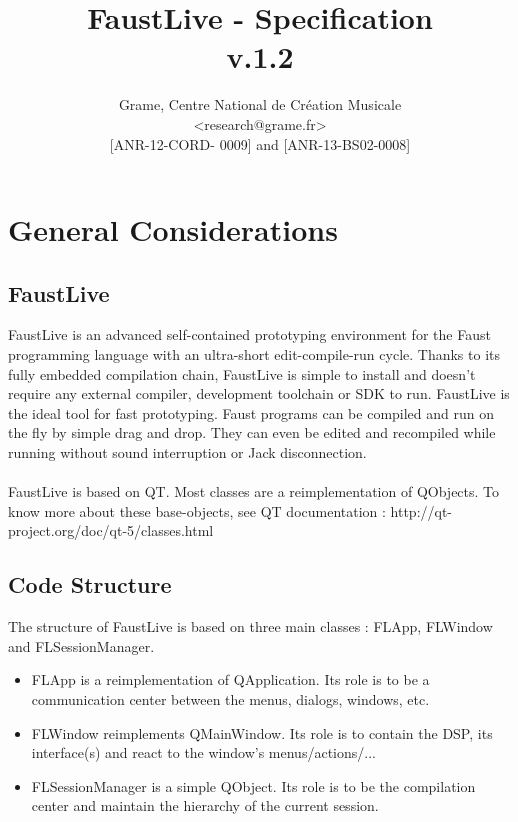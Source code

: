 \documentclass[a4paper]{article}
\begin{document}
\title{FaustLive - Specification \\ v.1.2}

\author{Grame, Centre National de Création Musicale\\
{\small <research@grame.fr>} \\
\vspace{2mm}
[ANR-12-CORD- 0009] and [ANR-13-BS02-0008]
}

\maketitle


\newpage
\tableofcontents

\newpage
\section{General Considerations}

\subsection{FaustLive}
FaustLive is an advanced self-contained prototyping environment for the Faust programming language with an ultra-short edit-compile-run cycle. Thanks to its fully embedded compilation chain, FaustLive is simple to install and doesn't require any external compiler, development toolchain or SDK to run. FaustLive is the ideal tool for fast prototyping. Faust programs can be compiled and run on the fly by simple drag and drop. They can even be edited and recompiled while running without sound interruption or Jack disconnection. \\
\\
FaustLive is based on QT. Most classes are a reimplementation of QObjects. 
To know more about these base-objects, see QT documentation : http://qt-project.org/doc/qt-5/classes.html

\subsection{Code Structure}

The structure of FaustLive is based on three main classes : FLApp, FLWindow and FLSessionManager.

\begin{itemize}
\item FLApp is a reimplementation of QApplication. Its role is to be a communication center between the menus, dialogs, windows, etc. 

\item FLWindow reimplements QMainWindow. Its role is to contain the DSP, its interface(s) and react to the window's menus/actions/...

\item FLSessionManager is a simple QObject. Its role is to be the compilation center and maintain the hierarchy of the current session. 

\end{itemize}
\end{document}
